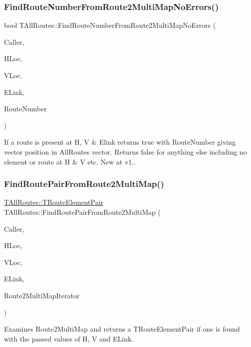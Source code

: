 \subsubsection{\texorpdfstring{Find\+Route\+Number\+From\+Route2\+Multi\+Map\+No\+Errors()}{FindRouteNumberFromRoute2MultiMapNoErrors()}}
{\footnotesize\ttfamily bool T\+All\+Routes\+::\+Find\+Route\+Number\+From\+Route2\+Multi\+Map\+No\+Errors (\begin{DoxyParamCaption}\item[{int}]{Caller,  }\item[{int}]{H\+Loc,  }\item[{int}]{V\+Loc,  }\item[{int}]{E\+Link,  }\item[{int \&}]{Route\+Number }\end{DoxyParamCaption})}

If a route is present at H, V \& Elink returns true with Route\+Number giving vector position in All\+Routes vector. Returns false for anything else including no element or route at H \& V etc. New at v1.. \mbox{\label{class_t_all_routes_a73d2c20327947600e5af57f908359343}} 
\subsubsection{\texorpdfstring{Find\+Route\+Pair\+From\+Route2\+Multi\+Map()}{FindRoutePairFromRoute2MultiMap()}}
{\footnotesize\ttfamily \mbox{\hyperlink{class_t_all_routes_a159a7d547e3d435d109a36cb41193a78}{T\+All\+Routes\+::\+T\+Route\+Element\+Pair}} T\+All\+Routes\+::\+Find\+Route\+Pair\+From\+Route2\+Multi\+Map (\begin{DoxyParamCaption}\item[{int}]{Caller,  }\item[{int}]{H\+Loc,  }\item[{int}]{V\+Loc,  }\item[{int}]{E\+Link,  }\item[{T\+Route2\+Multi\+Map\+Iterator \&}]{Route2\+Multi\+Map\+Iterator }\end{DoxyParamCaption})}

Examines Route2\+Multi\+Map and returns a T\+Route\+Element\+Pair if one is found with the passed values of H, V and E\+Link.

